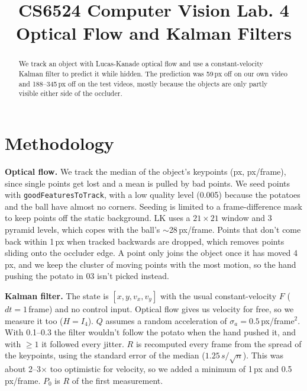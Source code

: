 \documentclass[conference]{assets/latex/IEEEtran}
\begin{document}
\title{CS6524 Computer Vision Lab. 4\\ Optical Flow and Kalman Filters}

\author{
\and
{}
}

\maketitle

\begin{abstract}
We track an object with Lucas-Kanade optical flow and use a constant-velocity
Kalman filter to predict it while hidden. The prediction was 59\,px off on
our own video and 188--345\,px off on the test videos, mostly because the
objects are only partly visible either side of the occluder.
\end{abstract}

\section{Methodology}

\textbf{Optical flow.} We track the median of the object's keypoints (px,
px/frame), since single points get lost and a mean is pulled by bad points. We seed points with \texttt{goodFeaturesToTrack}, with a
low quality level (0.005) because the potatoes and the ball have almost no
corners. Seeding is limited to a frame-difference mask to keep points off the
static background. LK uses a
$21\times21$ window and 3 pyramid levels, which copes with the ball's
$\sim$28\,px/frame. Points that don't come back within 1\,px when tracked backwards
are dropped, which removes points sliding onto the occluder edge. A point only joins the object once it has moved 4\,px, and
we keep the cluster of moving points with the most motion, so the hand
pushing the potato in 03 isn't picked instead.

\textbf{Kalman filter.} The state is $[x, y, v_x, v_y]$ with the usual
constant-velocity $F$ ($dt=1$\,frame) and no control input. Optical flow gives
us velocity for free, so we measure it too ($H=I_4$). $Q$ assumes a random acceleration of
$\sigma_a=0.5$\,px/frame$^2$. With 0.1--0.3 the filter wouldn't follow the
potato when the hand pushed it, and with $\ge 1$ it followed every jitter. $R$
is recomputed every frame from the spread of the keypoints, using the standard
error of the median ($1.25\,s/\sqrt{n}$). This was about 2--3$\times$ too
optimistic for velocity, so we added a minimum of 1\,px and 0.5\,px/frame.
$P_0$ is $R$ of the first measurement.
\end{document}
